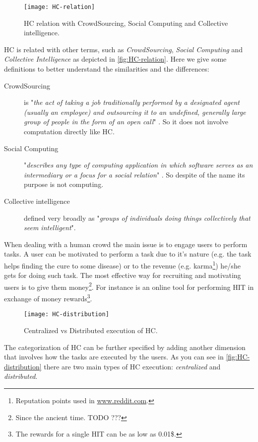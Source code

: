 \begin{figure}[htb]
    \centering
    \texttt{[image: HC-relation]}
    \caption{\acl{HC} relation with CrowdSourcing, Social Computing and Collective
    intelligence.}
    \label{fig:HC-relation}
\end{figure}
\acl{HC} is related with other terms, such as \emph{CrowdSourcing},
\emph{Social Computing} and \emph{Collective Intelligence} as depicted in
\autoref{fig:HC-relation}. Here we give some definitions to better understand the
similarities and the differences:
\begin{description}
    \item[CrowdSourcing] is "\emph{the act of taking a job traditionally
    performed by a designated agent (usually an employee) and outsourcing it to an
    undefined, generally large group of people in the form of an open call}"
    \cite{howe2006rise}. So it does not involve computation directly like \ac{HC}.

    \item[Social Computing] "\emph{describes any type of computing application
    in which software serves as an intermediary or a focus for a social relation}"
    \cite{schuler1994social}. So despite of the name its purpose is not computing.

    \item[Collective intelligence] defined very broadly as "\emph{groups of
    individuals doing things collectively that seem intelligent}".
\end{description}

When dealing with a human crowd the main issue is to engage users to perform tasks.
A user can be motivated to perform a task due to it's nature
(e.g. the task helps finding the cure to some disease) or to the revenue (e.g.
karma\footnote{Reputation points used in \url{www.reddit.com}.}) he/she gets for doing
such task. The most effective way for recruiting and motivating users is to give
them money\footnote{Since the ancient time. TODO ???}. For instance
 is an online tool for performing \ac{HIT} in exchange of money
rewards\footnote{The rewards for a single \ac{HIT} can be as low as 0.01\$.}.\\

\begin{figure}[htb]
    \centering
    \texttt{[image: HC-distribution]}
    \caption{Centralized vs Distributed execution of \acl{HC}.}
    \label{fig:HC-distribution}
\end{figure}
The categorization of \ac{HC} can be further specified by adding another dimension
that involves how the tasks are executed by the users. As you can see in
\autoref{fig:HC-distribution} there are two main types of \ac{HC} execution:
\emph{centralized} and \emph{distributed}.






